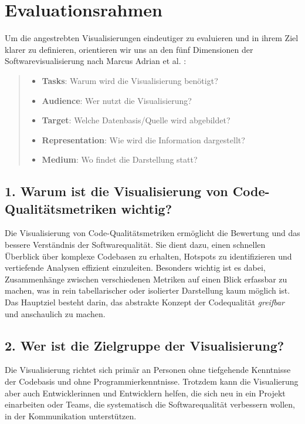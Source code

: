 \section{Evaluationsrahmen} \label{sec:Evaluationsrahmen}

Um die angestrebten Visualisierungen eindeutiger zu evaluieren und in ihrem Ziel klarer zu definieren, orientieren wir uns an den fünf Dimensionen der Softwarevisualisierung nach Marcus Adrian et al. \cite[2]{3dsoftwareMarcus}:
\begin{quote}
    \begin{itemize}
        \item \textbf{Tasks}: Warum wird die Visualisierung benötigt?
        \item \textbf{Audience}: Wer nutzt die Visualisierung?
        \item \textbf{Target}: Welche Datenbasis/Quelle wird abgebildet?
        \item \textbf{Representation}: Wie wird die Information dargestellt?
        \item \textbf{Medium}: Wo findet die Darstellung statt?
    \end{itemize}
\end{quote}

\subsection*{1. Warum ist die Visualisierung von Code-Qualitätsmetriken wichtig?}
Die Visualisierung von Code-Qualitätsmetriken ermöglicht die Bewertung und das bessere Verständnis der Softwarequalität. Sie dient dazu, einen schnellen Überblick über komplexe Codebasen zu erhalten, Hotspots zu identifizieren und vertiefende Analysen effizient einzuleiten. Besonders wichtig ist es dabei, Zusammenhänge zwischen verschiedenen Metriken auf einen Blick erfassbar zu machen, was in rein tabellarischer oder isolierter Darstellung kaum möglich ist. Das Hauptziel besteht darin, das abstrakte Konzept der Codequalität \textit{greifbar} und anschaulich zu machen.

\subsection*{2. Wer ist die Zielgruppe der Visualisierung?}
Die Visualisierung richtet sich primär an Personen ohne tiefgehende Kenntnisse der Codebasis und ohne Programmierkenntnisse. Trotzdem kann die Visualierung aber auch Entwicklerinnen und Entwicklern helfen, die sich neu in ein Projekt einarbeiten oder Teams, die systematisch die Softwarequalität verbessern wollen, in der Kommunikation unterstützen.

